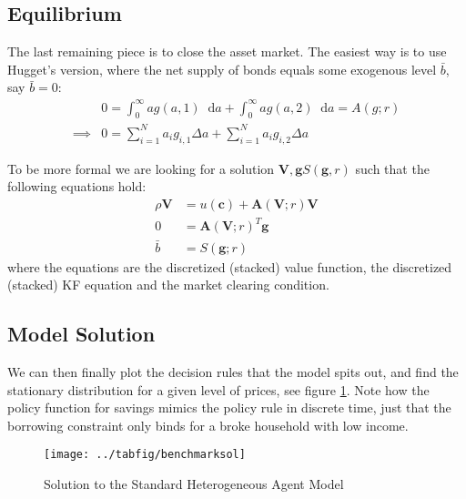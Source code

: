 \documentclass[12pt]{article}
\DeclareMathOperator{\1}{\mathbbm{1}}
\newcommand*\diff{\mathop{}\!\mathrm{d}}
\begin{document}
\subsection{Equilibrium}
The last remaining piece is to close the asset market. The easiest way is to use Hugget's version, where the net supply of bonds equals some exogenous level $\bar b$, say $\bar b = 0$:
\begin{equation*}
\begin{split}
&0=\int_0^\infty ag(a,1) \diff a  + \int_0^\infty ag(a,2) \diff a = A(g;r) \\  \implies  & 0=\sum_{i=1}^N a_ig_{i,1} \Delta a + \sum_{i=1}^N a_ig_{i,2} \Delta a
\end{split}
\end{equation*}


To be more formal we are looking for a solution $\mathbf{V},\mathbf{g}S(\mathbf{g},r)$ such that the following equations hold:
\begin{equation}
\begin{split}
\rho \mathbf{V}&=u(\mathbf{c}) + \mathbf{A}(\mathbf{V};r) \mathbf{V} \\
0 &= \mathbf{A}(\mathbf{V};r)^T \mathbf{g} \\
\bar b &= S(\mathbf{g};r)
\end{split}
\end{equation}
where the equations are the discretized (stacked) value function, the discretized (stacked) KF equation and the market clearing condition.



\subsection{Model Solution}
We can then finally plot the decision rules that the model spits out, and find the stationary distribution for a given level of prices, see figure \ref{fig:solBenchmark}. Note how the policy function for savings mimics the policy rule in discrete time, just that the borrowing constraint only binds for a broke household with low income.
\begin{figure}
\center
\caption{Solution to the Standard Heterogeneous Agent Model}
\label{fig:solBenchmark}
\texttt{[image: ../tabfig/benchmarksol]}
\end{figure}
\end{document}
